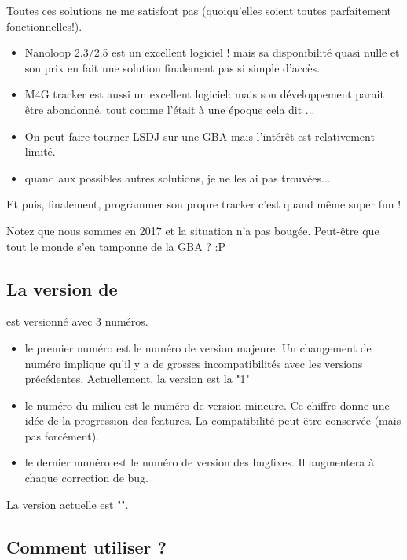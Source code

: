Toutes ces solutions ne me satisfont pas (quoiqu'elles soient toutes parfaitement fonctionnelles!).
\medskip

\begin{itemize}
  \item{Nanoloop 2.3/2.5 est un excellent logiciel ! mais sa disponibilité quasi nulle et son prix en fait une solution finalement pas si simple d'accès.}
  \item{M4G tracker est aussi un excellent logiciel: mais son développement parait être abondonné, tout comme l'était \FAT à une époque cela dit ...}
  \item{On peut faire tourner LSDJ sur une GBA mais l'intérêt est relativement limité.}
  \item{quand aux possibles autres solutions, je ne les ai pas trouvées...}
\end{itemize}\medskip

Et puis, finalement, programmer son propre tracker c'est quand même super fun !
\medskip

Notez que nous sommes en 2017 et la situation n'a pas bougée. Peut-être que tout le monde s'en tamponne de la GBA ? :P \medskip

\subsection{La version de \FAT}

\FAT est versionné avec 3 numéros.
\begin{itemize}
  \item{le premier numéro est le numéro de version majeure. Un changement de numéro implique qu'il y a de grosses incompatibilités avec les versions précédentes.
              Actuellement, la version est la "1"}
  \item{le numéro du milieu est le numéro de version mineure.
              Ce chiffre donne une idée de la progression des features. La compatibilité peut être conservée (mais pas forcément).}
  \item{le dernier numéro est le numéro de version des bugfixes. Il augmentera à chaque correction de bug.}
\end{itemize}
\medskip

La version actuelle est "\fatversion".

\subsection{Comment utiliser \FAT ?}

